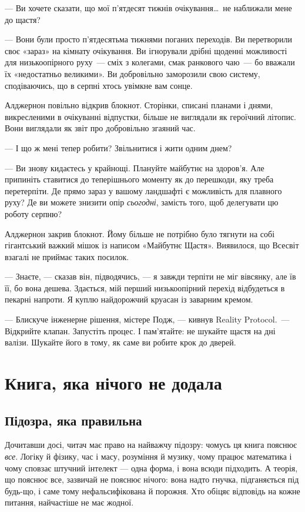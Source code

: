 \documentclass[12pt, a4paper, openany]{book}
\begin{document}
\begin{realitybox}
--- Ви хочете сказати, що мої п'ятдесят тижнів очікування\ldots\ не наближали мене до щастя?

--- Вони були просто п'ятдесятьма тижнями поганих переходів. Ви перетворили своє «зараз» на кімнату очікування. Ви ігнорували дрібні щоденні можливості для низькоопірного руху~--- сміх з колегами, смак ранкового чаю~--- бо вважали їх «недостатньо великими». Ви добровільно заморозили свою систему, сподіваючись, що в серпні хтось увімкне вам сонце.

\medskip
Алджернон повільно відкрив блокнот. Сторінки, списані планами і днями, викресленими в очікуванні відпустки, більше не виглядали як героїчний літопис. Вони виглядали як звіт про добровільно згаяний час.

--- І що ж мені тепер робити? Звільнитися і жити одним днем?

--- Ви знову кидаєтесь у крайнощі. Плануйте майбутнє на здоров'я. Але припиніть ставитися до теперішнього моменту як до перешкоди, яку треба перетерпіти. Де прямо зараз у вашому ландшафті є можливість для плавного руху? Де ви можете знизити опір \textit{сьогодні}, замість того, щоб делегувати цю роботу серпню?

\medskip
Алджернон закрив блокнот. Йому більше не потрібно було тягнути на собі гігантський важкий мішок із написом «Майбутнє Щастя». Виявилося, що Всесвіт взагалі не приймає таких посилок.

--- Знаєте, --- сказав він, підводячись, --- я завжди терпіти не міг вівсянку, але їв її, бо вона дешева. Здається, мій перший низькоопірний перехід відбудеться в пекарні напроти. Я куплю найдорожчий круасан із заварним кремом.

--- Блискуче інженерне рішення, містере Подж, --- кивнув Reality Protocol.~--- Відкрийте клапан. Запустіть процес. І пам'ятайте: не шукайте щастя на дні валізи. Шукайте його в тому, як саме ви робите крок до дверей.
\end{realitybox}

\chapter{Книга, яка нічого не додала}

\section{Підозра, яка правильна}

Дочитавши досі, читач має право на найважчу підозру: чомусь ця книга пояснює \emph{все}. Логіку й фізику, час і масу, розуміння й музику, чому працює математика і чому сповзає штучний інтелект --- одна форма, і вона всюди підходить. А теорія, що пояснює все, зазвичай не пояснює нічого: вона надто гнучка, підганяється під будь-що, і саме тому нефальсифікована й порожня. Хто обіцяє відповідь на кожне питання, найчастіше не має жодної.
\end{document}
